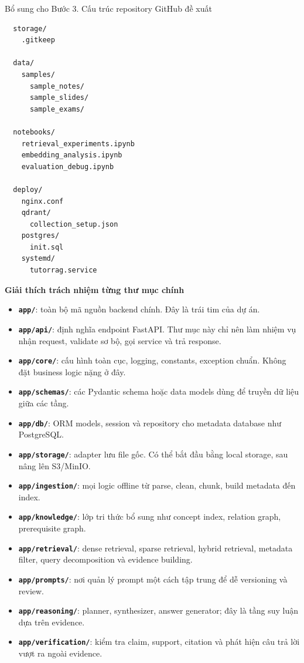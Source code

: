 \documentclass[12pt,a4paper]{article}
\begin{document}
\begin{stepbox}{Bổ sung cho Bước 3. Cấu trúc repository GitHub đề xuất}
\begin{lstlisting}
  storage/
    .gitkeep

  data/
    samples/
      sample_notes/
      sample_slides/
      sample_exams/

  notebooks/
    retrieval_experiments.ipynb
    embedding_analysis.ipynb
    evaluation_debug.ipynb

  deploy/
    nginx.conf
    qdrant/
      collection_setup.json
    postgres/
      init.sql
    systemd/
      tutorrag.service
\end{lstlisting}

\textbf{Giải thích trách nhiệm từng thư mục chính}
\begin{itemize}
    \item \textbf{\texttt{app/}}: toàn bộ mã nguồn backend chính. Đây là trái tim của dự án.
    \item \textbf{\texttt{app/api/}}: định nghĩa endpoint FastAPI. Thư mục này chỉ nên làm nhiệm vụ nhận request, validate sơ bộ, gọi service và trả response.
    \item \textbf{\texttt{app/core/}}: cấu hình toàn cục, logging, constants, exception chuẩn. Không đặt business logic nặng ở đây.
    \item \textbf{\texttt{app/schemas/}}: các Pydantic schema hoặc data models dùng để truyền dữ liệu giữa các tầng.
    \item \textbf{\texttt{app/db/}}: ORM models, session và repository cho metadata database như PostgreSQL.
    \item \textbf{\texttt{app/storage/}}: adapter lưu file gốc. Có thể bắt đầu bằng local storage, sau nâng lên S3/MinIO.
    \item \textbf{\texttt{app/ingestion/}}: mọi logic offline từ parse, clean, chunk, build metadata đến index.
    \item \textbf{\texttt{app/knowledge/}}: lớp tri thức bổ sung như concept index, relation graph, prerequisite graph.
    \item \textbf{\texttt{app/retrieval/}}: dense retrieval, sparse retrieval, hybrid retrieval, metadata filter, query decomposition và evidence building.
    \item \textbf{\texttt{app/prompts/}}: nơi quản lý prompt một cách tập trung để dễ versioning và review.
    \item \textbf{\texttt{app/reasoning/}}: planner, synthesizer, answer generator; đây là tầng suy luận dựa trên evidence.
    \item \textbf{\texttt{app/verification/}}: kiểm tra claim, support, citation và phát hiện câu trả lời vượt ra ngoài evidence.

\end{itemize}
\end{stepbox}
\end{document}
